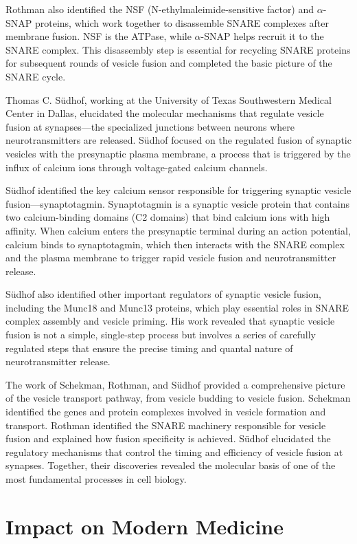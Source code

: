 Rothman also identified the NSF (N-ethylmaleimide-sensitive factor) and $\alpha$-SNAP proteins, which work together to disassemble SNARE complexes after membrane fusion. NSF is the ATPase, while $\alpha$-SNAP helps recruit it to the SNARE complex. This disassembly step is essential for recycling SNARE proteins for subsequent rounds of vesicle fusion and completed the basic picture of the SNARE cycle.

Thomas C. S\"udhof, working at the University of Texas Southwestern Medical Center in Dallas, elucidated the molecular mechanisms that regulate vesicle fusion at synapses---the specialized junctions between neurons where neurotransmitters are released. S\"udhof focused on the regulated fusion of synaptic vesicles with the presynaptic plasma membrane, a process that is triggered by the influx of calcium ions through voltage-gated calcium channels.

S\"udhof identified the key calcium sensor responsible for triggering synaptic vesicle fusion---synaptotagmin. Synaptotagmin is a synaptic vesicle protein that contains two calcium-binding domains (C2 domains) that bind calcium ions with high affinity. When calcium enters the presynaptic terminal during an action potential, calcium binds to synaptotagmin, which then interacts with the SNARE complex and the plasma membrane to trigger rapid vesicle fusion and neurotransmitter release.

S\"udhof also identified other important regulators of synaptic vesicle fusion, including the Munc18 and Munc13 proteins, which play essential roles in SNARE complex assembly and vesicle priming. His work revealed that synaptic vesicle fusion is not a simple, single-step process but involves a series of carefully regulated steps that ensure the precise timing and quantal nature of neurotransmitter release.

The work of Schekman, Rothman, and S\"udhof provided a comprehensive picture of the vesicle transport pathway, from vesicle budding to vesicle fusion. Schekman identified the genes and protein complexes involved in vesicle formation and transport. Rothman identified the SNARE machinery responsible for vesicle fusion and explained how fusion specificity is achieved. S\"udhof elucidated the regulatory mechanisms that control the timing and efficiency of vesicle fusion at synapses. Together, their discoveries revealed the molecular basis of one of the most fundamental processes in cell biology.

\section{Impact on Modern Medicine}

